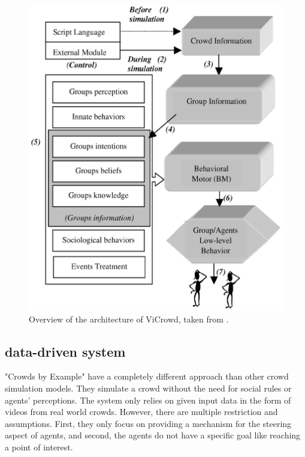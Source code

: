 \documentclass{acmsiggraph}               %
\begin{document}
\begin{figure}[h]
  \centering
  \includegraphics[width=1\linewidth]{images/HierarchicalArchitectureOverview.png}
  \caption{Overview of the architecture of ViCrowd, taken from \protect\cite{musse_hierarchical_2001}.}
  \label{fig:hierarchicalarchitectureOverview}
\end{figure}

\subsection{data-driven system}
"Crowds by Example" \cite{lerner_crowds_2007} have a completely different approach than other crowd simulation models. They simulate a crowd without the need for social rules or agents' perceptions. The system only relies on given input data in the form of videos from real world crowds.
However, there are multiple restriction and assumptions. First, they only focus on providing a mechanism for the steering aspect of agents, and second, the agents do not have a specific goal like reaching a point of interest.
\end{document}
